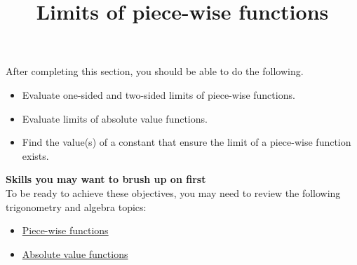 \documentclass{ximera}
\title{Limits of piece-wise functions}
\begin{document}
\begin{abstract}
\end{abstract}
\maketitle

\begin{sectionOutcomes}
After completing this section, you should be able to do the following. 

\begin{itemize}
\item Evaluate one-sided and two-sided limits of piece-wise functions.
\item Evaluate limits of absolute value functions. 
\item Find the value(s) of a constant that ensure the limit of a piece-wise function exists. 
\end{itemize}
\end{sectionOutcomes}

\phantom{text}%


\textbf{Skills you may want to brush up on first} \\ To be ready to achieve these objectives, you may need to review the following trigonometry and algebra topics: 
\begin{itemize}
    \item \href{https://ximera.osu.edu/math160fa17/m160prerequisites/PreRequisiteXards/U2CommonFunctions/2.4PieceWiseFunctions/titlePage}{Piece-wise functions}
    \item \href{https://www.youtube.com/watch?v=71SfBO-B4dE}{Absolute value functions}
    
\end{itemize}
\end{document}
